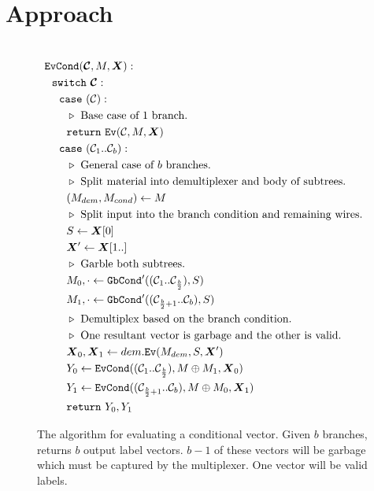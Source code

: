 \section{Approach}\label{sec:approach}

\begin{figure}
  \begin{align*}
  \end{align*}
\end{figure}


\begin{figure}
  \begin{align*}
    &\evcond(\vec{\cir}, M, \vec{X}):\\
    &~~\switch~\vec{\cir}:\\
    &~~~~\ccase~(\cir):\\
    &~~~~~~\codecomment{Base case of $1$ branch.}\\
    &~~~~~~\creturn~\ev(\cir, M, \vec{X})\\
    &~~~~\ccase~(\cir_1..\cir_b):\\
    &~~~~~~\codecomment{General case of $b$ branches.}\\
    &~~~~~~\codecomment{Split material into demultiplexer and body of subtrees.}\\
    &~~~~~~(M_{dem}, M_{cond}) \gets M\\
    &~~~~~~\codecomment{Split input into the branch condition and remaining wires.}\\
    &~~~~~~S \gets \vec{X}[0]\\
    &~~~~~~\vec{X}' \gets \vec{X}[1..]\\
    &~~~~~~\codecomment{Garble both subtrees.}\\
    &~~~~~~M_0,\cdot \gets \gbcond'((\cir_1..\cir_{\frac{b}{2}}), S)\\
    &~~~~~~M_1,\cdot \gets \gbcond'((\cir_{\frac{b}{2}+1}..\cir_b), S)\\
    &~~~~~~\codecomment{Demultiplex based on the branch condition.}\\
    &~~~~~~\codecomment{One resultant vector is garbage and the other is valid.}\\
    &~~~~~~\vec{X}_0, \vec{X}_1 \gets dem.\ev(M_{dem}, S, \vec{X}')\\
    &~~~~~~Y_0 \gets \evcond((\cir_1..\cir_{\frac{b}{2}}), M \oplus M_1, \vec{X}_0)\\
    &~~~~~~Y_1 \gets \evcond((\cir_{\frac{b}{2}+1}..\cir_b), M \oplus M_0, \vec{X}_1)\\
    &~~~~~~\creturn~Y_0, Y_1
  \end{align*}
  \caption{%
    The algorithm for evaluating a conditional vector.
    Given $b$ branches, \evcond returns $b$ output label vectors.
    $b-1$ of these vectors will be garbage which must be captured by
    the multiplexer.
    One vector will be valid labels.
  }
\end{figure}
